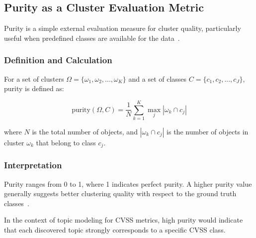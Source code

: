 \subsection{Purity as a Cluster Evaluation Metric}\label{sec:purity}

Purity is a simple external evaluation measure for cluster quality, particularly useful when predefined classes are available for the data~\cite{purity_usuage}.

\subsubsection{Definition and Calculation}

For a set of clusters $\Omega = \{\omega_1, \omega_2, ..., \omega_K\}$ and a set of classes $C = \{c_1, c_2, ..., c_J\}$, purity is defined as:

\begin{equation}
	\text{purity}(\Omega, C) = \frac{1}{N} \sum_{k=1}^K \max_j |\omega_k \cap c_j|
\end{equation}

where $N$ is the total number of objects, and $|\omega_k \cap c_j|$ is the number of objects in cluster $\omega_k$ that belong to class $c_j$.

\subsubsection{Interpretation}

Purity ranges from 0 to 1, where 1 indicates perfect purity. A higher purity value generally suggests better clustering quality with respect to the ground truth classes~\cite{purity_info_ret}.

In the context of topic modeling for CVSS metrics, high purity would indicate that each discovered topic strongly corresponds to a specific CVSS class.


